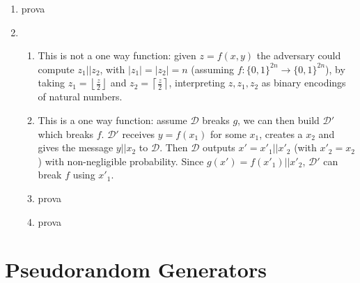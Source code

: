 \documentclass{article}
\newcommand{\distinguisher}{\mathcal{D}}
\newcommand{\abs}[1]{\left| {#1} \right|}
\newcommand{\floor}[1]{\left\lfloor {#1} \right\rfloor}
\newcommand{\ceil}[1]{\left\lceil {#1} \right\rceil}
\begin{document}
\begin{enumerate}
	\item prova

	\item
		\begin{enumerate}
			\item This is not a one way function: given $z = f(x,y)$ the adversary could compute $z_1 || z_2$, with $\abs{z_1} = \abs{z_2} = n$ (assuming $f : \{0,1\}^{2n} \to \{0,1\}^{2n}$), by taking $z_1 = \floor{\frac{z}{2}}$ and $z_2 = \ceil{\frac{z}{2}}$, interpreting $z, z_1, z_2$ as binary encodings of natural numbers.
			\item This is a one way function: assume $\distinguisher$ breaks $g$, we can then build $\distinguisher'$ which breaks $f$.
				$\distinguisher'$ receives $y = f(x_1)$ for some $x_1$, creates a $x_2$ and gives the message $y || x_2$ to $\distinguisher$.
				Then $\distinguisher$ outputs $x' = x'_1 || x'_2$ (with $x'_2 = x_2$) with non-negligible probability.
				Since $g(x') = f(x'_1) || x'_2$, $\distinguisher'$ can break $f$ using $x'_1$.
			\item prova
			\item prova
		\end{enumerate}
\end{enumerate}

\section{Pseudorandom Generators}
\end{document}
